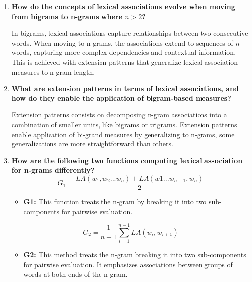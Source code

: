 \documentclass{article}
\begin{document}
\begin{enumerate}
    \item \textbf{How do the concepts of lexical associations evolve when moving from bigrams to n-grams where $ n > 2 $?}

    In bigrams, lexical associations capture relationships between two consecutive words. When moving to n-grams, the associations extend to sequences of $ n $ words, capturing more complex dependencies and contextual information. This is achieved with extension patterns that generalize lexical association measures to n-gram length.

    \item \textbf{What are extension patterns in terms of lexical associations, and how do they enable the application of bigram-based measures?}

    Extension patterns consists on decomposing n-gram associations into a combination of smaller units, like bigrams or trigrams. Extension patterns enable application of bi-grand measures by generalizing to n-grams, some generalizations are more straightforward than others.
  
    \item \textbf{How are the following two functions computing lexical association for n-grams differently?}
	\begin{equation*}
	G_1 = \frac{LA(w_1, w_2 ... w_n) + LA(w1 ... w_{n-1}, w_n)}{2}
	\end{equation*}
   	\begin{itemize}
        \item \textbf{G1:} This function treats the n-gram by breaking it into two sub-components for pairwise evaluation.
    	\end{itemize}

	\begin{equation*}
	G_2 = \frac{1}{n - 1}\sum^{n-1}_{i=1}LA(w_i, w_{i+1})
	\end{equation*}
	\begin{itemize}
        \item \textbf{G2:} This method treats the n-gram breaking it into two sub-components for pairwise evaluation. It emphasizes associations between groups of words at both ends of the n-gram.
    \end{itemize}
\end{enumerate}
\end{document}
